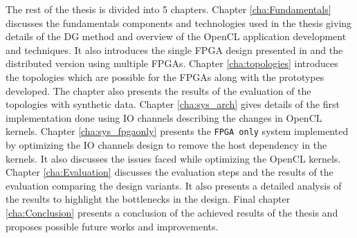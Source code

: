 The rest of the thesis is divided into 5 chapters. Chapter \ref{cha:Fundamentals} discusses
the fundamentals components and technologies used in the thesis giving details of the DG method
and overview of the OpenCL application development and techniques. It also introduces
the single FPGA design presented in \cite{kenter_opencl-based_2018} and the distributed
version using multiple FPGAs. Chapter \ref{cha:topologies} introduces the topologies which
are possible for the FPGAs along with the prototypes developed. The chapter also presents
the results of the evaluation of the topologies with synthetic data. Chapter \ref{cha:sys_arch}
gives details of the first implementation done using IO channels describing
the changes in OpenCL kernels. Chapter \ref{cha:sys_fpgaonly}
presents the \texttt{FPGA only} system implemented by optimizing the IO channels design
to remove the host dependency in the kernels. It also discusses the issues faced while
optimizing the OpenCL kernels. Chapter \ref{cha:Evaluation} discusses the evaluation steps
and the results of the evaluation comparing the design variants. It also presents a detailed
analysis of the results to highlight the bottlenecks in the design.
Final chapter \ref{cha:Conclusion} presents a conclusion of the achieved results of the thesis
and proposes possible future works and improvements.